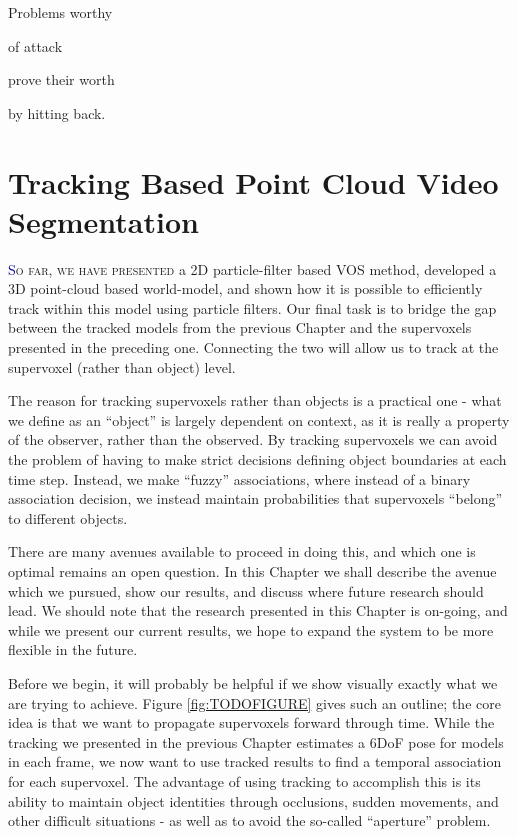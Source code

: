 \begin{savequote}[75mm]
Problems worthy

of attack

prove their worth

by hitting back. 
\end{savequote}


\chapter{Tracking Based Point Cloud Video Segmentation}
\label{Chap:TrackingBasedSegmentation}
\lettrine[lines=3, loversize=0.3]{\textcolor{DarkBlue}S}{o far, we have presented} a 2D particle-filter based VOS method, developed a 3D point-cloud based world-model, and shown how it is possible to efficiently track within this model using particle filters. Our final task is to bridge the gap between the tracked models from the previous Chapter and the supervoxels presented in the preceding one. Connecting the two will allow us to track at the supervoxel (rather than object) level. 

The reason for tracking supervoxels rather than objects is a practical one - what we define as an ``object'' is largely dependent on context, as it is really a property of the observer, rather than the observed. By tracking supervoxels we can avoid the problem of having to make strict decisions defining object boundaries at each time step. Instead, we make ``fuzzy'' associations, where instead of a binary association decision, we instead maintain probabilities that supervoxels ``belong'' to different objects.

There are many avenues available to proceed in doing this, and which one is optimal remains an open question. In this Chapter we shall describe the avenue which we pursued, show our results, and discuss where future research should lead. We should note that the research presented in this Chapter is on-going, and while we present our current results, we hope to expand the system to be more flexible in the future.

Before we begin, it will probably be helpful if we show visually exactly what we are trying to achieve. Figure \ref{fig:TODOFIGURE} gives such an outline; the core idea is that we want to propagate supervoxels forward through time.  While the tracking we presented in the previous Chapter estimates a 6DoF pose for models in each frame, we now want to use tracked results to find a temporal association for each supervoxel. The advantage of using tracking to accomplish this is its ability to maintain object identities through occlusions, sudden movements, and other difficult situations - as well as to avoid the so-called ``aperture'' problem. 

